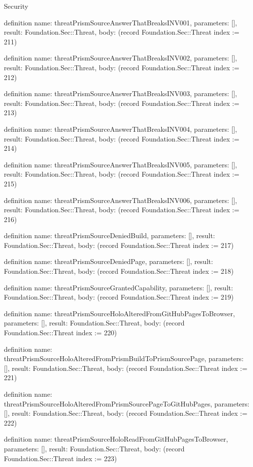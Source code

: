 \begin{lexlean}{Security}
\begin{semanticmodule}
definition{
  name: threatPrismSourceAnswerThatBreaksINV001,
  parameters: [],
  result: Foundation.Sec::Threat,
  body: (record Foundation.Sec::Threat {index := 211})
}

definition{
  name: threatPrismSourceAnswerThatBreaksINV002,
  parameters: [],
  result: Foundation.Sec::Threat,
  body: (record Foundation.Sec::Threat {index := 212})
}

definition{
  name: threatPrismSourceAnswerThatBreaksINV003,
  parameters: [],
  result: Foundation.Sec::Threat,
  body: (record Foundation.Sec::Threat {index := 213})
}

definition{
  name: threatPrismSourceAnswerThatBreaksINV004,
  parameters: [],
  result: Foundation.Sec::Threat,
  body: (record Foundation.Sec::Threat {index := 214})
}

definition{
  name: threatPrismSourceAnswerThatBreaksINV005,
  parameters: [],
  result: Foundation.Sec::Threat,
  body: (record Foundation.Sec::Threat {index := 215})
}

definition{
  name: threatPrismSourceAnswerThatBreaksINV006,
  parameters: [],
  result: Foundation.Sec::Threat,
  body: (record Foundation.Sec::Threat {index := 216})
}

definition{
  name: threatPrismSourceDeniedBuild,
  parameters: [],
  result: Foundation.Sec::Threat,
  body: (record Foundation.Sec::Threat {index := 217})
}

definition{
  name: threatPrismSourceDeniedPage,
  parameters: [],
  result: Foundation.Sec::Threat,
  body: (record Foundation.Sec::Threat {index := 218})
}

definition{
  name: threatPrismSourceGrantedCapability,
  parameters: [],
  result: Foundation.Sec::Threat,
  body: (record Foundation.Sec::Threat {index := 219})
}

definition{
  name: threatPrismSourceHoloAlteredFromGitHubPagesToBrowser,
  parameters: [],
  result: Foundation.Sec::Threat,
  body: (record Foundation.Sec::Threat {index := 220})
}

definition{
  name: threatPrismSourceHoloAlteredFromPrismBuildToPrismSourcePage,
  parameters: [],
  result: Foundation.Sec::Threat,
  body: (record Foundation.Sec::Threat {index := 221})
}

definition{
  name: threatPrismSourceHoloAlteredFromPrismSourcePageToGitHubPages,
  parameters: [],
  result: Foundation.Sec::Threat,
  body: (record Foundation.Sec::Threat {index := 222})
}

definition{
  name: threatPrismSourceHoloReadFromGitHubPagesToBrowser,
  parameters: [],
  result: Foundation.Sec::Threat,
  body: (record Foundation.Sec::Threat {index := 223})
}


\end{semanticmodule}
\end{lexlean}
